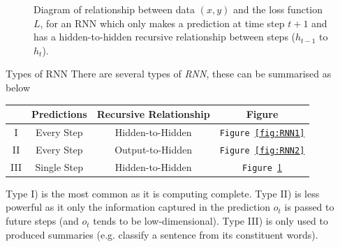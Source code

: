 \documentclass[11pt,a4paper]{article}
\begin{document}
  \begin{figure}[ht!]
    \centering
    \begin{center}\end{center}
    \caption{Diagram of relationship between data $(x,y)$ and the loss function $L$, for an RNN which only makes a prediction at time step $t+1$ and has a hidden-to-hidden recursive relationship between steps ($h_{t-1}$ to $h_t$).}
    \label{fig:RNN3}
  \end{figure}

  \begin{proposition}{Types of RNN}
    There are several types of \textit{RNN}, these can be summarised as below
    \begin{center}
      \begin{tabular}{|c|c|c|c|}
        \hline
        &\textbf{Predictions}&\textbf{Recursive Relationship}&\textbf{Figure}\\
        \hline
        I&Every Step&Hidden-to-Hidden&\texttt{Figure \ref{fig:RNN1}}\\
        II&Every Step&Output-to-Hidden&\texttt{Figure \ref{fig:RNN2}}\\
        III&Single Step&Hidden-to-Hidden&\texttt{Figure \ref{fig:RNN3}}\\
        \hline
      \end{tabular}
    \end{center}
    Type I) is the most common as it is computing complete. Type II) is less powerful as it only the information captured in the prediction $o_t$ is passed to future steps (and $o_t$ tends to be low-dimensional). Type III) is only used to produced summaries (e.g. classify a sentence from its constituent words).
  \end{proposition}
\end{document}
